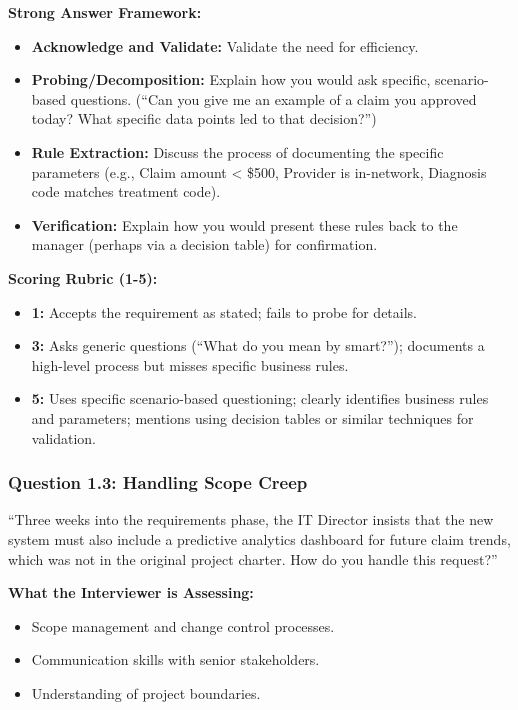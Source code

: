 \textbf{Strong Answer Framework:}

\begin{itemize}
\tightlist
\item
  \textbf{Acknowledge and Validate:} Validate the need for efficiency.
\item
  \textbf{Probing/Decomposition:} Explain how you would ask specific,
  scenario-based questions. (``Can you give me an example of a claim you
  approved today? What specific data points led to that decision?'')
\item
  \textbf{Rule Extraction:} Discuss the process of documenting the
  specific parameters (e.g., Claim amount \textless{} \$500, Provider is
  in-network, Diagnosis code matches treatment code).
\item
  \textbf{Verification:} Explain how you would present these rules back
  to the manager (perhaps via a decision table) for confirmation.
\end{itemize}

\textbf{Scoring Rubric (1-5):}

\begin{itemize}
\tightlist
\item
  \textbf{1:} Accepts the requirement as stated; fails to probe for
  details.
\item
  \textbf{3:} Asks generic questions (``What do you mean by smart?'');
  documents a high-level process but misses specific business rules.
\item
  \textbf{5:} Uses specific scenario-based questioning; clearly
  identifies business rules and parameters; mentions using decision
  tables or similar techniques for validation.
\end{itemize}

\subsubsection{Question 1.3: Handling Scope
Creep}\label{question-1.3-handling-scope-creep}

``Three weeks into the requirements phase, the IT Director insists that
the new system must also include a predictive analytics dashboard for
future claim trends, which was not in the original project charter. How
do you handle this request?''

\textbf{What the Interviewer is Assessing:}

\begin{itemize}
\tightlist
\item
  Scope management and change control processes.
\item
  Communication skills with senior stakeholders.
\item
  Understanding of project boundaries.
\end{itemize}

